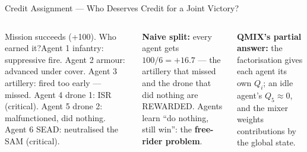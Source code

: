 \documentclass[aspectratio=169,10pt,t]{beamer}
\begin{document}
\begin{frame}{Credit Assignment --- Who Deserves Credit for a Joint Victory?}
\begin{columns}[T]
\begin{cbox}[ISSAnavy]{Mission succeeds (+100). Who earned it?}\scriptsize Agent 1 infantry: suppressive fire. Agent 2 armour: advanced under cover. Agent 3 artillery: fired too early --- missed. Agent 4 drone 1: ISR (critical). Agent 5 drone 2: malfunctioned, did nothing. Agent 6 SEAD: neutralised the SAM (critical).\end{cbox}
\begin{wbox}\scriptsize\textbf{Naive split:} every agent gets $100/6=+16.7$ --- the artillery that missed and the drone that did nothing are REWARDED. Agents learn ``do nothing, still win'': the \textbf{free-rider problem}.\end{wbox}
\begin{ibox}\scriptsize\textbf{QMIX's partial answer:} the factorisation gives each agent its own $Q_i$; an idle agent's $Q_5\approx0$, and the mixer weights contributions by the global state.\end{ibox}
\end{columns}
\end{frame}
\end{document}
